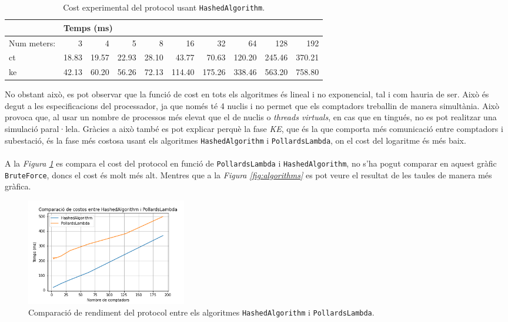 	\begin{table}[H]
	\centering
	\begin{tabular}{lrrrrrrrrr}
		\centering
		&\multicolumn{9}{l}{\centering Temps (ms)}\\
		\toprule
		Num meters: &           3  &       4  &           5  &            8  &              16  &         32  &         64  &      128 &     192 \\
		\midrule
		ct &  18.83 &  19.57 &  22.93 &  28.10 &   43.77 &   70.63&  120.20 &  245.46 &  370.21 \\
		ke &  42.13&  60.20 &  56.26&  72.13&  114.40 &  175.26&  338.46&  563.20 &  758.80 \\
		\bottomrule
	\end{tabular}
	\caption{Cost experimental del protocol usant \texttt{HashedAlgorithm}.}
	\label{tab:hashed}
\end{table}
No obstant això, es pot observar que la funció de cost en tots els algoritmes és lineal i no exponencial, tal i com hauria de ser. Això és degut a les especificacions del processador, ja que només té 4 nuclis i no permet que els comptadors treballin de manera simultània. Això provoca que, al usar un nombre de processos més elevat que el de nuclis o \textit{threads virtuals}, en cas que en tingués, no es pot realitzar una simulació paral·lela. Gràcies a això també es pot explicar perquè la fase \textit{KE}, que és la que comporta més comunicació entre comptadors i subestació, és la fase més costosa usant els algoritmes \texttt{HashedAlgorithm} i \texttt{PollardsLambda}, on el cost del logaritme és més baix.
\\
\\
 A la \textit{Figura \ref{fig:comparisons}} es compara el cost del protocol en funció de \texttt{PollardsLambda} i \texttt{HashedAlgorithm}, no s'ha pogut comparar en aquest gràfic \texttt{BruteForce}, doncs el cost és molt més alt.
 Mentres que a la \textit{Figura \ref{fig:algorithms}} es pot veure el resultat de les taules de manera més gràfica.
\begin{figure}[H]
	\centering
	\includegraphics[width=7cm]{imgs/cost/comp-hashed-pollards.png}
	\caption{Comparació de rendiment del protocol entre els algoritmes \texttt{HashedAlgorithm} i \texttt{PollardsLambda}.}
	\label{fig:comparisons}
\end{figure}

